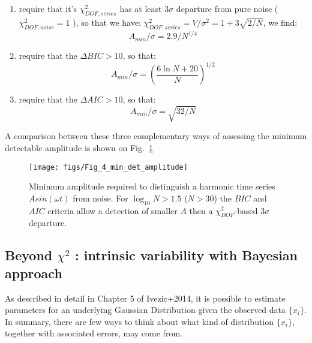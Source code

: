 \documentclass[fleqn,usenatbib]{mnras}  %
\begin{document}
\begin{enumerate}[label=\alph*)]

	\item require that it's $\chi^{2}_{DOF,series}$ has at least $3\sigma$ departure from pure noise ($\chi^{2}_{DOF,noise} = 1$ ),  so that we have:
	$\chi^{2}_{DOF,series} =  V / \sigma^{2} = 1 +3 \sqrt{2/N}$, we find:
	  \begin{equation}
	      A_{min} /\sigma = 2.9 / N^{1/4}
	  \end{equation}

	\item require that the $\Delta BIC > 10$, so that:
	  \begin{equation}
	      A_{min}/\sigma = \left( \frac{6 \ln {N} + 20 }{N} \right) ^ {1/2}
	  \end{equation}
	  
	\item require that the $\Delta AIC > 10$, so that: 
	  \begin{equation}
	      A_{min} / \sigma = \sqrt{32/N}
	  \end{equation}

\end{enumerate}


A comparison between these three complementary ways of assessing the minimum detectable amplitude is shown on Fig.~\ref{fig:chi_BIC_AIC}

\begin{figure}
 \texttt{[image: figs/Fig\_4\_min\_det\_amplitude]}
 \caption{Minimum amplitude required to distinguish a harmonic time series $A sin(\omega t)$  from noise. For $ \log_{10} N > 1.5$ ($N > 30 $) the $BIC$ and $AIC$ criteria allow a detection of smaller $A$ then a $\chi^{2}_{DOF}$-based $3\sigma$ departure.}
 \label{fig:chi_BIC_AIC}
\end{figure}

%
%

\subsection{Beyond $\chi^{2}$ : intrinsic variability with Bayesian approach}
\label{sec:beyondChi2}
As described in  detail in Chapter 5 of Ivezic+2014, it is possible to estimate parameters for  an underlying Gaussian Distribution given the observed data $\{x_{i}\}$. In summary, there are few ways to think about what kind of distribution $\{x_{i}\}$, together with associated errors, may come from. 
\end{document}
